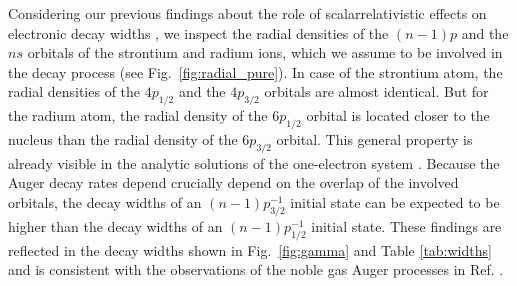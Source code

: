 Considering our previous findings about the role
of scalarrelativistic effects on electronic decay widths \cite{Fasshauer15_1},
we inspect the radial densities of the $(n-1)p$ and the $ns$ orbitals of the
strontium and radium ions,
which we assume to be involved in the decay process (see
Fig.~\ref{fig:radial_pure}).
In case of the strontium atom, the radial densities of the $4p_{1/2}$ and the
$4p_{3/2}$ orbitals are almost identical. But for the radium atom, the radial
density of the  $6p_{1/2}$ orbital is located closer to the nucleus than
the radial density of the $6p_{3/2}$ orbital. This general property is already
visible in the analytic solutions of the one-electron system \cite{Bethe_Salpeter}.
Because the Auger decay rates depend crucially depend on the overlap of the
involved orbitals, the decay widths of an $(n-1)p_{3/2}^{-1}$ initial state
can be expected to be higher than the decay widths of an $(n-1)p_{1/2}^{-1}$
initial state. These findings are reflected in the decay widths shown in
Fig.~\ref{fig:gamma} and Table \ref{tab:widths} and is consistent with the
observations of the noble gas Auger processes in Ref. \cite{Fasshauer15_1}.




